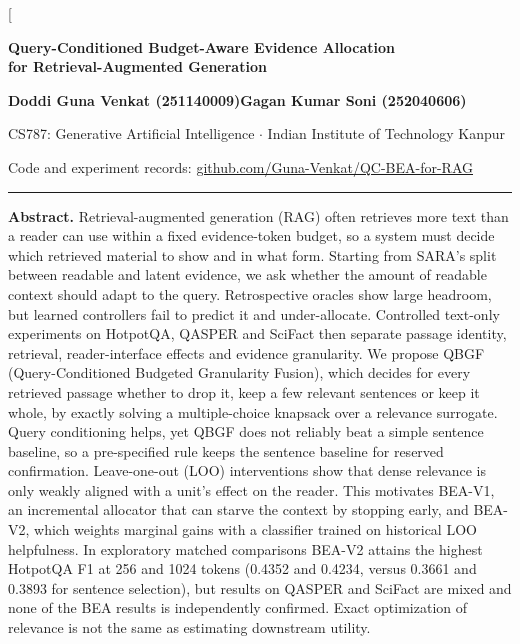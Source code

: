 \documentclass[10pt,twocolumn,letterpaper]{article}
\begin{document}
\twocolumn[{%
\begin{center}
{\LARGE\bfseries Query-Conditioned Budget-Aware Evidence Allocation\\[1pt] for Retrieval-Augmented Generation\par}
\vspace{5pt}
{\large\bfseries Doddi Guna Venkat (251140009)\quad Gagan Kumar Soni (252040606)\par}
\vspace{2pt}
{\small CS787: Generative Artificial Intelligence $\cdot$ Indian Institute of Technology Kanpur\par}
{\small Code and experiment records: \href{https://github.com/Guna-Venkat/QC-BEA-for-RAG}{github.com/Guna-Venkat/QC-BEA-for-RAG}\par}
\end{center}
\vspace{2pt}\hrule\vspace{5pt}
\begin{minipage}{\textwidth}\small
\noindent\textbf{Abstract.}
Retrieval-augmented generation (RAG) often retrieves more text than a reader can use within a fixed evidence-token budget, so a system must decide which retrieved material to show and in what form. Starting from SARA's split between readable and latent evidence, we ask whether the amount of readable context should adapt to the query. Retrospective oracles show large headroom, but learned controllers fail to predict it and under-allocate. Controlled text-only experiments on HotpotQA, QASPER and SciFact then separate passage identity, retrieval, reader-interface effects and evidence granularity. We propose QBGF (Query-Conditioned Budgeted Granularity Fusion), which decides for every retrieved passage whether to drop it, keep a few relevant sentences or keep it whole, by exactly solving a multiple-choice knapsack over a relevance surrogate. Query conditioning helps, yet QBGF does not reliably beat a simple sentence baseline, so a pre-specified rule keeps the sentence baseline for reserved confirmation. Leave-one-out (LOO) interventions show that dense relevance is only weakly aligned with a unit's effect on the reader. This motivates BEA-V1, an incremental allocator that can starve the context by stopping early, and BEA-V2, which weights marginal gains with a classifier trained on historical LOO helpfulness. In exploratory matched comparisons BEA-V2 attains the highest HotpotQA F1 at 256 and 1024 tokens (0.4352 and 0.4234, versus 0.3661 and 0.3893 for sentence selection), but results on QASPER and SciFact are mixed and none of the BEA results is independently confirmed. Exact optimization of relevance is not the same as estimating downstream utility.\par

\end{minipage}}
\end{document}
